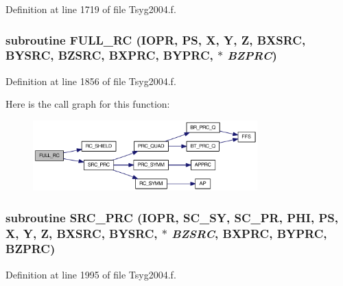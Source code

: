Definition at line 1719 of file Tsyg2004.f.\hypertarget{_tsyg2004_8f_0d4d2f068a308fa1c6c4bb86fac16f9b}{
\subsubsection[{FULL\_\-RC}]{\setlength{\rightskip}{0pt plus 5cm}subroutine FULL\_\-RC (IOPR, \/  PS, \/  X, \/  Y, \/  Z, \/  BXSRC, \/  BYSRC, \/  BZSRC, \/  BXPRC, \/  BYPRC, \/  $\ast$ {\em BZPRC})}}
\label{_tsyg2004_8f_0d4d2f068a308fa1c6c4bb86fac16f9b}




Definition at line 1856 of file Tsyg2004.f.

Here is the call graph for this function:\nopagebreak
\begin{figure}[H]
\begin{center}
\leavevmode
\includegraphics[width=245pt]{_tsyg2004_8f_0d4d2f068a308fa1c6c4bb86fac16f9b_cgraph}
\end{center}
\end{figure}
\hypertarget{_tsyg2004_8f_948852414e8750ea8068ebe4f3d03e96}{
\subsubsection[{SRC\_\-PRC}]{\setlength{\rightskip}{0pt plus 5cm}subroutine SRC\_\-PRC (IOPR, \/  SC\_\-SY, \/  SC\_\-PR, \/  PHI, \/  PS, \/  X, \/  Y, \/  Z, \/  BXSRC, \/  BYSRC, \/  $\ast$ {\em BZSRC}, \/  BXPRC, \/  BYPRC, \/  BZPRC)}}
\label{_tsyg2004_8f_948852414e8750ea8068ebe4f3d03e96}




Definition at line 1995 of file Tsyg2004.f.

